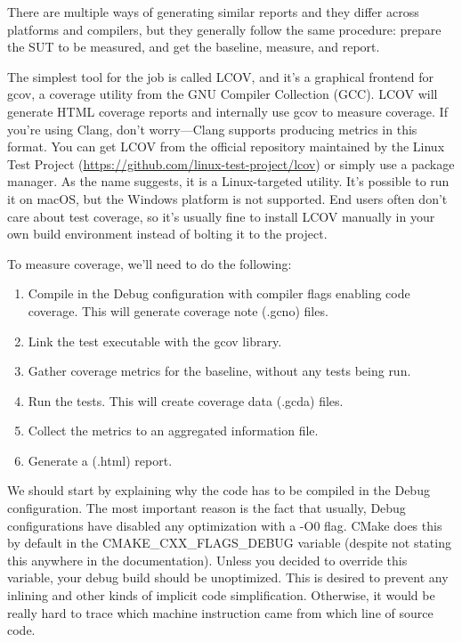 There are multiple ways of generating similar reports and they differ across platforms and compilers, but they generally follow the same procedure: prepare the SUT to be measured, and get the baseline, measure, and report.

The simplest tool for the job is called LCOV, and it's a graphical frontend for gcov, a coverage utility from the GNU Compiler Collection (GCC). LCOV will generate HTML coverage reports and internally use gcov to measure coverage. If you're using Clang, don't worry—Clang supports producing metrics in this format. You can get LCOV from the official repository maintained by the Linux Test Project (\url{https://github.com/linux-test-project/lcov}) or simply use a package manager. As the name suggests, it is a Linux-targeted utility. It's possible to run it on macOS, but the Windows platform is not supported. End users often don't care about test coverage, so it's usually fine to install LCOV manually in your own build environment instead of bolting it to the project.

To measure coverage, we'll need to do the following:

\begin{enumerate}
\item 
Compile in the Debug configuration with compiler flags enabling code coverage. This will generate coverage note (.gcno) files.

\item 
Link the test executable with the gcov library.

\item 
Gather coverage metrics for the baseline, without any tests being run.

\item 
Run the tests. This will create coverage data (.gcda) files.

\item 
Collect the metrics to an aggregated information file.

\item 
Generate a (.html) report.
\end{enumerate}

We should start by explaining why the code has to be compiled in the Debug configuration. The most important reason is the fact that usually, Debug configurations have disabled any optimization with a -O0 flag. CMake does this by default in the CMAKE\_CXX\_FLAGS\_DEBUG variable (despite not stating this anywhere in the documentation). Unless you decided to override this variable, your debug build should be unoptimized. This is desired to prevent any inlining and other kinds of implicit code simplification. Otherwise, it would be really hard to trace which machine instruction came from which line of source code.

